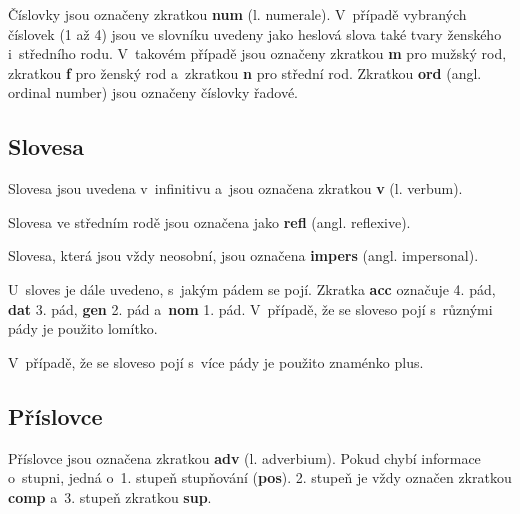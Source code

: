 Číslovky jsou označeny zkratkou \textbf{num} (l. numerale). V~případě vybraných číslovek (1 až 4) jsou ve slovníku uvedeny jako heslová slova také tvary ženského i~středního rodu. V~takovém případě jsou označeny zkratkou \textbf{m} pro mužský rod, zkratkou \textbf{f} pro ženský rod a~zkratkou \textbf{n} pro střední rod. Zkratkou \textbf{ord} (angl. ordinal number) jsou označeny číslovky řadové.

\blspace
  \dicEntry {} 
  \dicEntry {}  
  \dicEntry {}  
\blspace

\subsection*{Slovesa}

Slovesa jsou uvedena v~infinitivu a~jsou označena zkratkou \textbf{v} (l. verbum).

\blspace
  \dicEntry {} 
\blspace

Slovesa ve středním rodě jsou označena jako \textbf{refl} (angl. reflexive).

\blspace
  \dicEntry {}  
\blspace

Slovesa, která jsou vždy neosobní, jsou označena \textbf{impers} (angl. impersonal).

\blspace
  \dicEntry {}  
\blspace

U~sloves je dále uvedeno, s~jakým pádem se pojí. Zkratka \textbf{acc} označuje 4. pád, \textbf{dat} 3. pád, \textbf{gen} 2. pád a~\textbf{nom} 1. pád. V~případě, že se sloveso pojí s~různými pády je použito lomítko.

\blspace
  \dicEntry {}  
\blspace

V~případě, že se sloveso pojí s~více pády je použito znaménko plus.

\blspace
  \dicEntry {}  
\blspace

\subsection*{Příslovce}

Příslovce jsou označena zkratkou \textbf{adv} (l. adverbium). Pokud chybí informace o~stupni, jedná o~1. stupeň stupňování (\textbf{pos}). 2. stupeň je vždy označen zkratkou \textbf{comp} a~3. stupeň zkratkou \textbf{sup}.

